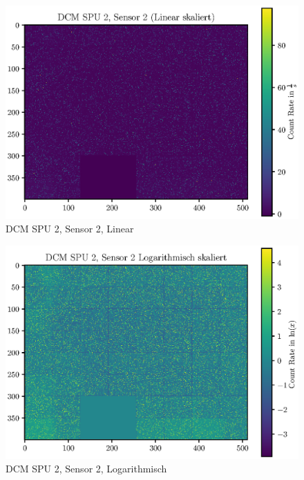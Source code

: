 \documentclass[12pt,twoside,a4paper]{scrartcl}
\begin{document}
			\begin{figure}[H]
				\includegraphics[width = \textwidth]{Plots/DCM/DCM_SPU2_Sensor2_lin.eps}
				\caption{DCM SPU 2, Sensor 2, Linear}
			\end{figure}

			\begin{figure}[H]
				\includegraphics[width = \textwidth]{Plots/DCM/DCM_SPU2_Sensor2_log.eps}
				\caption{DCM SPU 2, Sensor 2, Logarithmisch}
			\end{figure}
\end{document}
